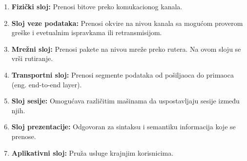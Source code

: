 \documentclass[a4paper]{article}
\begin{document}
            \begin{enumerate}
                \item \textbf{Fizički sloj:} Prenosi bitove preko komukacionog kanala.
                \item \textbf{Sloj veze podataka:} Prenosi okvire na nivou kanala
                      sa mogućom proverom greške i evetualnim ispravkama ili retransmisijom.
                \item \textbf{Mrežni sloj:} Prenosi pakete na nivou mreže preko rutera.
                      Na ovom sloju se vrši rutiranje.
                \item \textbf{Transportni sloj:} Prenosi segmente podataka od pošiljaoca do primaoca 
                      (eng. end-to-end layer).
                \item \textbf{Sloj sesije:} Omogućava različitim mašinama da uspostavljaju sesije između njih.
                \item \textbf{Sloj prezentacije:} Odgovoran za sintaksu i semantiku informacija koje se prenose.
                \item \textbf{Aplikativni sloj:} Pruža usluge krajnjim korisnicima.
            \end{enumerate}
        
\end{document}
